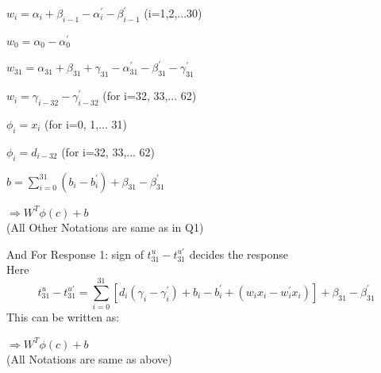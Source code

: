 \documentclass{article}
\begin{document}
\begin{center}
  \Large$w_i = \alpha_i + \beta_{i-1} - \alpha_i^{'} - \beta_{i-1}^{'}$  \large(i=1,2,...30)\\
\end{center}
\begin{center}
  \Large$w_0 = \alpha_0 - \alpha_0^{'}$\\
\end{center}
\begin{center}
  \Large$w_{31} = \alpha_{31} + \beta_{31} + \gamma_{31} - \alpha_{31}^{'} - \beta_{31}^{'} - \gamma_{31}^{'}$\\
\end{center}
\begin{center}
  \Large$w_i = \gamma_{i-32} - \gamma_{i-32}^{'}$  \large(for i=32, 33,... 62)\\
\end{center}
\begin{center}
  \Large$\phi_i = x_{i}$  \large(for i=0, 1,... 31)\\
\end{center}
\begin{center}
  \Large$\phi_i = d_{i-32}$  \large(for i=32, 33,... 62)\\
\end{center}
\begin{center}
  \Large$b= \sum_{i=0}^{31} (b_i - b_i^{'}) + \beta_{31} - \beta_{31}^{'}$\\
\end{center}
\begin{center}
  \Large$\Rightarrow W^{T}\phi(c) + b$\\
  \large (All Other Notations are same as in Q1)
\end{center}

And For Response 1: sign of $t_{31}^u - t_{31}^{u'}$ decides the response\\
Here \Large
\begin{equation}
  t_{31}^{u} - t_{31}^{u'} = \sum_{i=0}^{31}[d_i (\gamma_i - \gamma_i^{'}) + b_i - b_i^{'} + (w_ix_i - w_i^{'}x_i)] + \beta_{31} - \beta_{31}^{'}
\end{equation}
\large This can be written as:

\begin{center}
  \Large$\Rightarrow W^{T}\phi(c) + b$\\
  \large (All Notations are same as above)
\end{center}

\large
\end{document}
